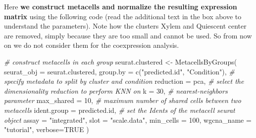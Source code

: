 \documentclass[
  letterpaper,
  DIV=11,
  numbers=noendperiod]{scrartcl}
\newenvironment{Shaded}{}{}
\newcommand{\AttributeTok}[1]{\textcolor[rgb]{0.49,0.56,0.16}{#1}}
\newcommand{\CommentTok}[1]{\textcolor[rgb]{0.38,0.63,0.69}{\textit{#1}}}
\newcommand{\ConstantTok}[1]{\textcolor[rgb]{0.53,0.00,0.00}{#1}}
\newcommand{\DecValTok}[1]{\textcolor[rgb]{0.25,0.63,0.44}{#1}}
\newcommand{\FunctionTok}[1]{\textcolor[rgb]{0.02,0.16,0.49}{#1}}
\newcommand{\NormalTok}[1]{#1}
\newcommand{\OtherTok}[1]{\textcolor[rgb]{0.00,0.44,0.13}{#1}}
\newcommand{\StringTok}[1]{\textcolor[rgb]{0.25,0.44,0.63}{#1}}
\begin{document}
Here \textbf{we construct metacells and normalize the resulting
expression matrix} using the following code (read the additional text in
the box above to understand the parameters). Note how the clusters Xylem
and Quiescent center are removed, simply because they are too small and
cannot be used. So from now on we do not consider them for the
coexpression analysis.

\begin{Shaded}
\begin{Highlighting}[]
\CommentTok{\# construct metacells  in each group}
\NormalTok{seurat.clustered }\OtherTok{\textless{}{-}} \FunctionTok{MetacellsByGroups}\NormalTok{(}
  \AttributeTok{seurat\_obj =}\NormalTok{ seurat.clustered,}
  \AttributeTok{group.by =} \FunctionTok{c}\NormalTok{(}\StringTok{"predicted.id"}\NormalTok{, }\StringTok{"Condition"}\NormalTok{), }\CommentTok{\# specify metadata to split by cluster and condition}
  \AttributeTok{reduction =} \StringTok{\textquotesingle{}pca\textquotesingle{}}\NormalTok{, }\CommentTok{\# select the dimensionality reduction to perform KNN on}
  \AttributeTok{k =} \DecValTok{30}\NormalTok{, }\CommentTok{\# nearest{-}neighbors parameter}
  \AttributeTok{max\_shared =} \DecValTok{10}\NormalTok{, }\CommentTok{\# maximum number of shared cells between two metacells}
  \AttributeTok{ident.group =} \StringTok{\textquotesingle{}predicted.id\textquotesingle{}}\NormalTok{, }\CommentTok{\# set the Idents of the metacell seurat object}
  \AttributeTok{assay =} \StringTok{"integrated"}\NormalTok{,}
  \AttributeTok{slot =} \StringTok{"scale.data"}\NormalTok{,}
  \AttributeTok{min\_cells =} \DecValTok{100}\NormalTok{,}
  \AttributeTok{wgcna\_name =} \StringTok{"tutorial"}\NormalTok{,}
  \AttributeTok{verbose=}\ConstantTok{TRUE}
\NormalTok{)}
\end{Highlighting}
\end{Shaded}
\end{document}
